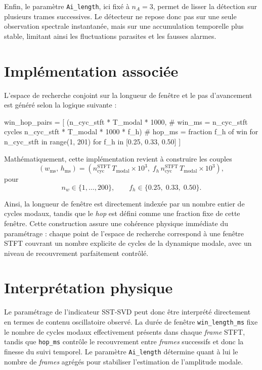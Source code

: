 \documentclass[12pt,a4paper, openany]{book}
\begin{document}
Enfin, le paramètre \texttt{Ai\_length}, ici fixé à $n_A=3$, permet de lisser la détection sur plusieurs trames successives. Le détecteur ne repose donc pas sur une seule observation spectrale instantanée, mais sur une accumulation temporelle plus stable, limitant ainsi les fluctuations parasites et les fausses alarmes.

\section{Implémentation associée}

L'espace de recherche conjoint sur la longueur de fenêtre et le pas d'avancement est généré selon la logique suivante :

\begin{codeboxpro}
win_hop_pairs = [
    (n_cyc_stft * T_modal * 1000,              # win_ms = n_cyc_stft cycles
     n_cyc_stft * T_modal * 1000 * f_h)        # hop_ms = fraction f_h of win
    for n_cyc_stft in range(1, 201)
    for f_h in [0.25, 0.33, 0.50]
]
\end{codeboxpro}

Mathématiquement, cette implémentation revient à construire les couples
\begin{equation}
\left(w_{\mathrm{ms}},\, h_{\mathrm{ms}}\right)
=
\left(
n_{\mathrm{cyc}}^{\mathrm{STFT}}\,T_{\mathrm{modal}}\times 10^{3},
\;
f_h\,n_{\mathrm{cyc}}^{\mathrm{STFT}}\,T_{\mathrm{modal}}\times 10^{3}
\right),
\end{equation}
pour
\begin{equation}
n_w \in \{1,\dots,200\},
\qquad
f_h \in \{0.25,\;0.33,\;0.50\}.
\end{equation}

Ainsi, la longueur de fenêtre est directement indexée par un nombre entier de cycles modaux, tandis que le \textit{hop} est défini comme une fraction fixe de cette fenêtre. Cette construction assure une cohérence physique immédiate du paramétrage : chaque point de l'espace de recherche correspond à une fenêtre STFT couvrant un nombre explicite de cycles de la dynamique modale, avec un niveau de recouvrement parfaitement contrôlé.

\section{Interprétation physique}

Le paramétrage de l'indicateur SST-SVD peut donc être interprété directement en termes de contenu oscillatoire observé. La durée de fenêtre \texttt{win\_length\_ms} fixe le nombre de cycles modaux effectivement présents dans chaque \textit{frame} STFT, tandis que \texttt{hop\_ms} contrôle le recouvrement entre \textit{frames} successifs et donc la finesse du suivi temporel. Le paramètre \texttt{Ai\_length} détermine quant à lui le nombre de \textit{frames} agrégés pour stabiliser l'estimation de l'amplitude modale.
\medskip
\end{document}
